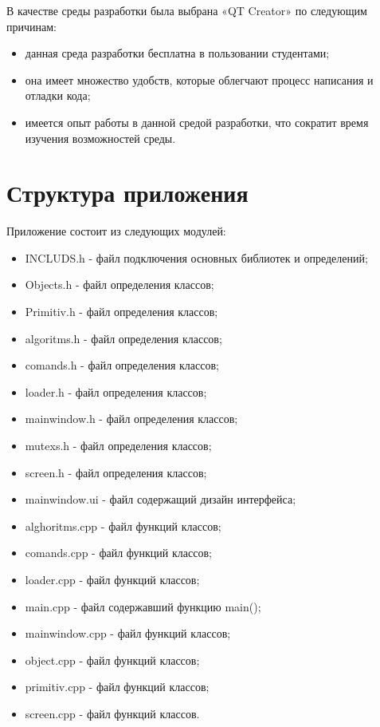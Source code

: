 \documentclass[a4paper,14pt]{report}
\begin{document}
В качестве среды разработки была выбрана «QT Creator» по следующим причинам:
\begin{itemize}
\item данная среда разработки бесплатна в пользовании студентами;
\item она имеет множество удобств, которые облегчают процесс написания и отладки кода;
\item имеется опыт работы в данной средой разработки, что сократит время изучения возможностей среды. 
\end{itemize}

\section{Структура приложения}
Приложение состоит из следующих модулей:
\begin{itemize}
 \item INCLUDS.h - файл подключения основных библиотек и определений;
    \item Objects.h - файл определения классов;
    \item Primitiv.h - файл определения классов;
    \item algoritms.h - файл определения классов;
    \item comands.h - файл определения классов;
    \item loader.h - файл определения классов;
    \item mainwindow.h - файл определения классов;
    \item mutexs.h - файл определения классов;
    \item screen.h - файл определения классов;
    \item mainwindow.ui - файл содержащий дизайн интерфейса;
    \item alghoritms.cpp - файл функций классов;
    \item comands.cpp - файл функций классов;
    \item loader.cpp - файл функций классов;
    \item main.cpp - файл содержавший функцию main();
    \item mainwindow.cpp - файл функций классов;
    \item object.cpp - файл функций классов;
    \item primitiv.cpp - файл функций классов;
    \item screen.cpp - файл функций классов.
\end{itemize}
\end{document}
